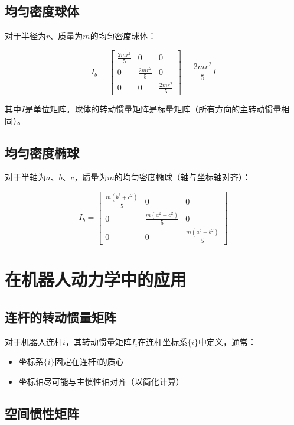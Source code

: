 \documentclass[12pt,a4paper]{article}
\begin{document}
\subsection{均匀密度球体}

对于半径为$r$、质量为$m$的均匀密度球体：

\begin{equation}
I_b = \begin{bmatrix}
\frac{2mr^2}{5} & 0 & 0 \\
0 & \frac{2mr^2}{5} & 0 \\
0 & 0 & \frac{2mr^2}{5}
\end{bmatrix} = \frac{2mr^2}{5} I
\end{equation}

其中$I$是单位矩阵。球体的转动惯量矩阵是标量矩阵（所有方向的主转动惯量相同）。

\subsection{均匀密度椭球}

对于半轴为$a$、$b$、$c$，质量为$m$的均匀密度椭球（轴与坐标轴对齐）：

\begin{equation}
I_b = \begin{bmatrix}
\frac{m(b^2 + c^2)}{5} & 0 & 0 \\
0 & \frac{m(a^2 + c^2)}{5} & 0 \\
0 & 0 & \frac{m(a^2 + b^2)}{5}
\end{bmatrix}
\end{equation}

\section{在机器人动力学中的应用}

\subsection{连杆的转动惯量矩阵}

对于机器人连杆$i$，其转动惯量矩阵$I_i$在连杆坐标系$\{i\}$中定义，通常：
\begin{itemize}
\item 坐标系$\{i\}$固定在连杆$i$的质心
\item 坐标轴尽可能与主惯性轴对齐（以简化计算）
\end{itemize}

\subsection{空间惯性矩阵}
\end{document}
